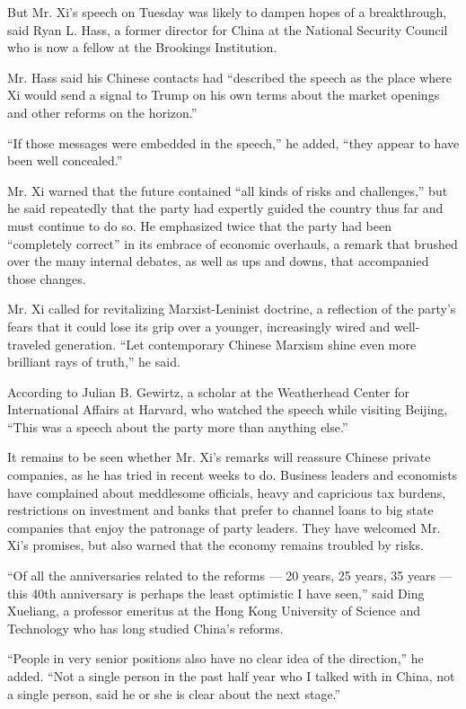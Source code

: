 But Mr. Xi's speech on Tuesday was likely to dampen hopes of a
breakthrough, said Ryan L. Hass, a former director for China at the
National Security Council who is now a fellow at the Brookings
Institution.

Mr. Hass said his Chinese contacts had ``described the speech as the
place where Xi would send a signal to Trump on his own terms about the
market openings and other reforms on the horizon.''

``If those messages were embedded in the speech,'' he added, ``they
appear to have been well concealed.''

Mr. Xi warned that the future contained ``all kinds of risks and
challenges,'' but he said repeatedly that the party had expertly guided
the country thus far and must continue to do so. He emphasized twice
that the party had been ``completely correct'' in its embrace of
economic overhauls, a remark that brushed over the many internal
debates, as well as ups and downs, that accompanied those changes.

Mr. Xi called for revitalizing Marxist-Leninist doctrine, a reflection
of the party's fears that it could lose its grip over a younger,
increasingly wired and well-traveled generation. ``Let contemporary
Chinese Marxism shine even more brilliant rays of truth,'' he said.

According to Julian B. Gewirtz, a scholar at the Weatherhead Center for
International Affairs at Harvard, who watched the speech while visiting
Beijing, ``This was a speech about the party more than anything else.''

It remains to be seen whether Mr. Xi's remarks will reassure Chinese
private companies, as he has tried in recent weeks to do. Business
leaders and economists have complained about meddlesome officials, heavy
and capricious tax burdens, restrictions on investment and banks that
prefer to channel loans to big state companies that enjoy the patronage
of party leaders. They have welcomed Mr. Xi's promises, but also warned
that the economy remains troubled by risks.

``Of all the anniversaries related to the reforms --- 20 years, 25
years, 35 years --- this 40th anniversary is perhaps the least
optimistic I have seen,'' said Ding Xueliang, a professor emeritus at
the Hong Kong University of Science and Technology who has long studied
China's reforms.

``People in very senior positions also have no clear idea of the
direction,'' he added. ``Not a single person in the past half year who I
talked with in China, not a single person, said he or she is clear about
the next stage.''

